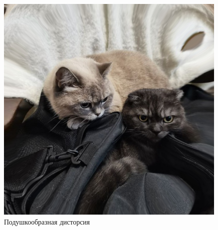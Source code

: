 \documentclass[a4paper, 16pt]{article}
\begin{document}
\begin{figure}[!htb]
    \centering
    \includegraphics[scale=0.3]{pil_distort.png}
    \captionsetup{skip=0pt}
    \caption{Подушкообразная дисторсия}
    \label{Рис:17}
\end{figure}


\newpage
\end{document}
